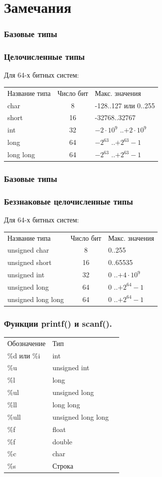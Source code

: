 \documentclass[12pt,pdf,hyperref={unicode}]{beamer}
\begin{document}
\section{Замечания}



\begin{frame}
\frametitle{Базовые типы}
\frametitle{Целочисленные типы} 
Для 64-х битных систем:
\begin{center}
\begin{tabular}{ l c l }
  Название типа & Число бит & Макс. значения \\
  char & 8 & -128..127 или 0..255 \\
  short & 16 & -32768..32767 \\
  int & 32 & $-2 \cdot 10^9$ ..$+2 \cdot 10^9$ \\
  long & 64& $-2^{63}$ ..$+2^{63}-1$ \\
  long long & 64 & $-2^{63}$ ..$+2^{63}-1$ \\
\end{tabular}
\end{center}
\end{frame}

\begin{frame}
\frametitle{Базовые типы}
\frametitle{Беззнаковые целочисленные типы} 
Для 64-х битных систем:
\begin{center}
\begin{tabular}{ l c l }
  Название типа & Число бит & Макс. значения \\
  unsigned char & 8 & 0..255 \\
  unsigned short & 16 & 0..65535 \\
  unsigned int & 32 & $0$ ..$+4 \cdot 10^9$ \\
  unsigned long & 64 & $0$ ..$+2^{64}-1$ \\
  unsigned long long & 64 & $0$ ..$+2^{64}-1$ \\
\end{tabular}
\end{center}
\end{frame}



\begin{frame}
\frametitle{Функции printf() и scanf().}
\begin{center}
\begin{tabular}{ l l l }
  Обозначение & Тип \\
  \%d или \%i & int \\
  \%u & unsigned int \\
  \%l & long \\
  \%ul & unsigned long \\
  \%ll & long long \\
  \%ull & unsigned long long \\
  \%f & float \\
  \%f & double \\
  \%c & char \\
  \%s & Строка\\
\end{tabular}
\end{center}
\end{frame}
\end{document}

